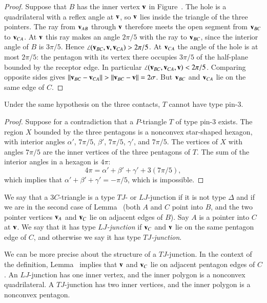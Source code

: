 \begin{proof}
  Suppose that $B$ has the inner vertex ${\mathbf v}$ in Figure~.
  The hole is a quadrilateral with a reflex angle at ${\mathbf v}$, so ${\mathbf v}$ lies
  inside the triangle of the three pointers. The ray from ${\mathbf v}_{AB}$
  through ${\mathbf v}$ therefore meets the open segment from ${\mathbf v}_{BC}$ to
  ${\mathbf v}_{CA}$. At ${\mathbf v}$ this ray makes an angle $2\pi/5$ with the ray
  to ${\mathbf v}_{BC}$, since the interior angle of $B$ is $3\pi/5$.
  Hence $\angle({\mathbf v}_{BC},{\mathbf v},{\mathbf v}_{CA})>2\pi/5$.
  At ${\mathbf v}_{CA}$ the angle of the hole is at most $2\pi/5$: the pentagon
  with its vertex there occupies $3\pi/5$ of the half-plane bounded by
  the receptor edge. In particular
  $\angle({\mathbf v}_{BC},{\mathbf v}_{CA},{\mathbf v})<2\pi/5$.
  Comparing opposite sides gives
  $\norm{\v_{BC}}{\v_{CA}}>\norm{\v_{BC}}{\v}=2\sigma$.
  But ${\mathbf v}_{BC}$ and ${\mathbf v}_{CA}$ lie on the same edge of $C$.
\end{proof}

\begin{lemma} Under the same hypothesis on the three contacts, $T$ cannot have type pin-$3$.
\end{lemma}

\begin{proof} 
  Suppose for a contradiction that a $P$-triangle $T$ of type pin-$3$
  exists.  The region $X$ bounded by the three pentagons is a
  nonconvex star-shaped hexagon, with interior angles $\alpha'$,
  $7\pi/5$, $\beta'$, $7\pi/5$, $\gamma'$, and $7\pi/5$.  The vertices
  of $X$ with angles $7\pi/5$ are the inner vertices of the three
  pentagons of $T$.  The sum of the interior angles in a hexagon is
  $4\pi$:
\[
4\pi = \alpha'+\beta'+\gamma' + 3 (7\pi/5),
\]
which implies that $\alpha'+\beta'+\gamma' = -\pi/5$, which is
impossible.
\end{proof}

\begin{definition}
  We say that a $3C$-triangle is a type $TJ$- or $LJ$-junction if it
  is not type $\Delta$ and if we are in the second case of
  Lemma~ (both $A$ and $C$ point into $B$, and the two
  pointer vertices ${\mathbf v}_A$ and ${\mathbf v}_C$ lie on adjacent edges of $B$).
  Say $A$ is a pointer into $C$ at ${\mathbf v}$.  We say that it has type {\it
    $LJ$-junction} if ${\mathbf v}_C$ and ${\mathbf v}$ lie on the same pentagon edge of
  $C$, and otherwise we say it has type {\it $TJ$-junction}.
\end{definition}

We can be more precise about the structure of a $TJ$-junction.  In the
context of the definition, Lemma~ implies that ${\mathbf v}$
and ${\mathbf v}_C$ lie on adjacent pentagon edges of $C$.  An $LJ$-junction
has one inner vertex, and the inner polygon is a nonconvex quadrilateral.
A $TJ$-junction has two inner vertices, and the inner polygon is a
nonconvex pentagon.


